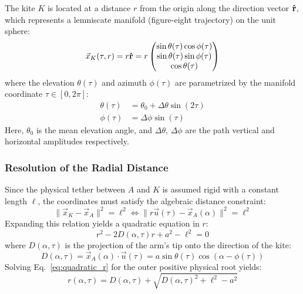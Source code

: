 \documentclass{article}
\begin{document}
The kite $K$ is located at a distance $r$ from the origin along the direction vector $\vu r$, which represents a lemniscate manifold (figure-eight trajectory) on the unit sphere:
\begin{equation}
\vec{x}_K(\tau, r) = r \vu r = r \begin{pmatrix} \sin\theta(\tau)\cos\phi(\tau) \\ \sin\theta(\tau)\sin\phi(\tau) \\ \cos\theta(\tau) \end{pmatrix}
\end{equation}
where the elevation $\theta(\tau)$ and azimuth $\phi(\tau)$ are parametrized by the manifold coordinate $\tau \in [0, 2\pi]$:
\begin{align}
\theta(\tau) &= \theta_0 + \Delta\theta \sin(2\tau) \\
\phi(\tau) &= \Delta\phi \sin(\tau)
\end{align}
Here, $\theta_0$ is the mean elevation angle, and $\Delta\theta$, $\Delta\phi$ are the path vertical and horizontal amplitudes respectively.

\subsubsection{Resolution of the Radial Distance}
Since the physical tether between $A$ and $K$ is assumed rigid with a constant length $\ell$, the coordinates must satisfy the algebraic distance constraint:
\begin{equation}
\|\vec{x}_K - \vec{x}_A\|^2 = \ell^2 \iff \|r\vec{u}(\tau) - \vec{x}_A(\alpha)\|^2 = \ell^2
\end{equation}
Expanding this relation yields a quadratic equation in $r$:
\begin{equation}
r^2 - 2 D(\alpha, \tau) r + a^2 - \ell^2 = 0
\label{eq:quadratic_r}
\end{equation}
where $D(\alpha, \tau)$ is the projection of the arm's tip onto the direction of the kite:
\begin{equation}
D(\alpha, \tau) = \vec{x}_A(\alpha) \cdot \vec{u}(\tau) = a \sin\theta(\tau) \cos(\alpha - \phi(\tau))
\end{equation}
Solving Eq.~\eqref{eq:quadratic_r} for the outer positive physical root yields:
\begin{equation}
r(\alpha, \tau) = D(\alpha, \tau) + \sqrt{D(\alpha, \tau)^2 + \ell^2 - a^2}
\end{equation}
\end{document}
